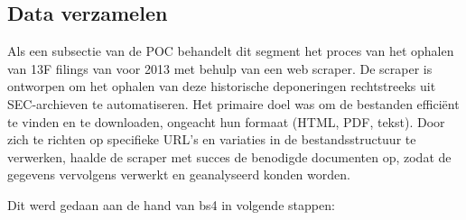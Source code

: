 \subsection{Data verzamelen}
Als een subsectie van de POC behandelt dit segment het proces van het ophalen van 13F filings van voor 2013 met behulp van een web scraper. De scraper is ontworpen om het ophalen van deze historische deponeringen rechtstreeks uit SEC-archieven te automatiseren. Het primaire doel was om de bestanden efficiënt te vinden en te downloaden, ongeacht hun formaat (HTML, PDF, tekst). Door zich te richten op specifieke URL's en variaties in de bestandsstructuur te verwerken, haalde de scraper met succes de benodigde documenten op, zodat de gegevens vervolgens verwerkt en geanalyseerd konden worden.

Dit werd gedaan aan de hand van bs4 in volgende stappen:

